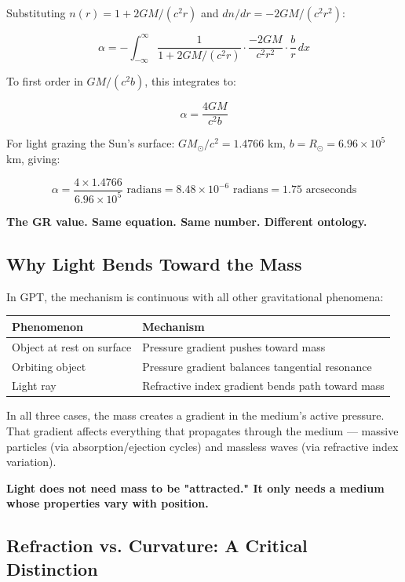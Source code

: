 \documentclass[12pt, a4paper]{article}
\begin{document}
Substituting \( n(r) = 1 + 2GM/(c^2 r) \) and \( dn/dr = -2GM/(c^2 r^2) \):

\[
\alpha = -\int_{-\infty}^{\infty} \frac{1}{1 + 2GM/(c^2 r)} \cdot \frac{-2GM}{c^2 r^2} \cdot \frac{b}{r} \, dx
\]

To first order in \( GM/(c^2 b) \), this integrates to:

\[
\alpha = \frac{4GM}{c^2 b}
\]

For light grazing the Sun's surface: \( GM_\odot/c^2 = 1.4766 \) km, \( b = R_\odot = 6.96 \times 10^5 \) km, giving:

\[
\alpha = \frac{4 \times 1.4766}{6.96 \times 10^5} \text{ radians} = 8.48 \times 10^{-6} \text{ radians} = 1.75 \text{ arcseconds}
\]

\textbf{The GR value. Same equation. Same number. Different ontology.}

\subsection{Why Light Bends Toward the Mass}
\label{subsec:why_light_bends_mass}

In GPT, the mechanism is continuous with all other gravitational phenomena:

\begin{center}
\begin{tabular}{|p{5cm}|p{9cm}|}
\hline
\textbf{Phenomenon} & \textbf{Mechanism} \\
\hline
Object at rest on surface & Pressure gradient pushes toward mass \\
\hline
Orbiting object & Pressure gradient balances tangential resonance \\
\hline
Light ray & Refractive index gradient bends path toward mass \\
\hline
\end{tabular}
\end{center}

In all three cases, the mass creates a gradient in the medium's active pressure. That gradient affects everything that propagates through the medium — massive particles (via absorption/ejection cycles) and massless waves (via refractive index variation).

\textbf{Light does not need mass to be "attracted." It only needs a medium whose properties vary with position.}

\subsection{Refraction vs. Curvature: A Critical Distinction}
\label{subsec:refraction_vs_curvature}
\end{document}
